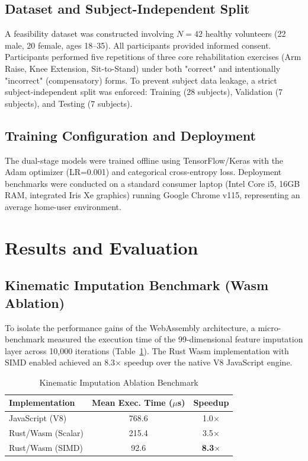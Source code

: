 \documentclass[conference]{IEEEtran}
\begin{document}
\subsection{Dataset and Subject-Independent Split}
A feasibility dataset was constructed involving $N=42$ healthy volunteers (22 male, 20 female, ages 18--35). All participants provided informed consent. Participants performed five repetitions of three core rehabilitation exercises (Arm Raise, Knee Extension, Sit-to-Stand) under both "correct" and intentionally "incorrect" (compensatory) forms. To prevent subject data leakage, a strict subject-independent split was enforced: Training (28 subjects), Validation (7 subjects), and Testing (7 subjects).

\subsection{Training Configuration and Deployment}
The dual-stage models were trained offline using TensorFlow/Keras with the Adam optimizer (LR=0.001) and categorical cross-entropy loss. Deployment benchmarks were conducted on a standard consumer laptop (Intel Core i5, 16GB RAM, integrated Iris Xe graphics) running Google Chrome v115, representing an average home-user environment.

\section{Results and Evaluation}

\subsection{Kinematic Imputation Benchmark (Wasm Ablation)}
To isolate the performance gains of the WebAssembly architecture, a micro-benchmark measured the execution time of the 99-dimensional feature imputation layer across 10,000 iterations (Table~\ref{tab:ablation}). The Rust Wasm implementation with SIMD enabled achieved an 8.3$\times$ speedup over the native V8 JavaScript engine.

\begin{table}[htbp]
\caption{Kinematic Imputation Ablation Benchmark}
\begin{center}
\begin{tabular}{@{}lcc@{}}
\toprule
\textbf{Implementation} & \textbf{Mean Exec. Time ($\mu$s)} & \textbf{Speedup} \\ \midrule
JavaScript (V8) & 768.6 & 1.0$\times$ \\
Rust/Wasm (Scalar) & 215.4 & 3.5$\times$ \\
Rust/Wasm (SIMD) & 92.6 & \textbf{8.3$\times$} \\ \bottomrule
\end{tabular}
\label{tab:ablation}
\end{center}
\end{table}
\end{document}
